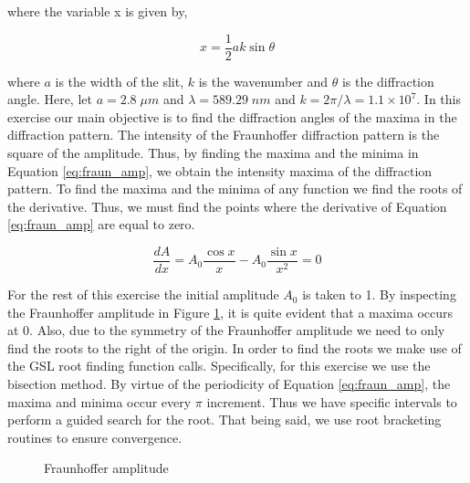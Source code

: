 \documentclass{article}
\begin{document}
where the variable x is given by,

\begin{equation}
\label{eq:fraun_x}
  x = \frac{1}{2}ak\sin{\theta}
\end{equation}

where $a$ is the width of the slit, $k$ is the wavenumber and $\theta$ is the diffraction angle. Here, let $a = 2.8\;\mu m$ and $\lambda = 589.29\;nm$ and $k = 2\pi/\lambda = 1.1 \times 10^{7}$.
In this exercise our main objective is
to find the diffraction angles of the maxima in the diffraction pattern. The intensity of the Fraunhoffer diffraction pattern is the square of
the amplitude. Thus, by finding the maxima and the minima in Equation \ref{eq:fraun_amp}, we obtain the intensity maxima of the diffraction
pattern. To find the maxima and the minima of any function we find the roots of the derivative. Thus, we must find the points where the derivative
of Equation \ref{eq:fraun_amp} are equal to zero.

\begin{equation}
\label{eq:amp_derivative}
  \frac{dA}{dx} = A_{0}\frac{\cos{x}}{x} - A_{0}\frac{\sin{x}}{x^2} = 0
\end{equation}

For the rest of this exercise the initial amplitude $A_{0}$ is taken to 1. By inspecting the Fraunhoffer amplitude in Figure \ref{fig:fraun_amp},
it is quite evident that a maxima occurs at 0. Also, due to the symmetry of the Fraunhoffer amplitude we need to only find the roots to the right
of the origin. In order to find the roots we make use of the GSL root finding function calls. Specifically, for this exercise we use the bisection
method. By virtue of the periodicity of Equation \ref{eq:fraun_amp}, the maxima and minima occur every $\pi$ increment. Thus we have specific
intervals to perform a guided search for the root. That being said, we use root bracketing routines to ensure convergence.

\begin{figure}[H]
  \begin{center}
  \end{center}
  \caption{Fraunhoffer amplitude}
  \label{fig:fraun_amp}
\end{figure}
\end{document}
